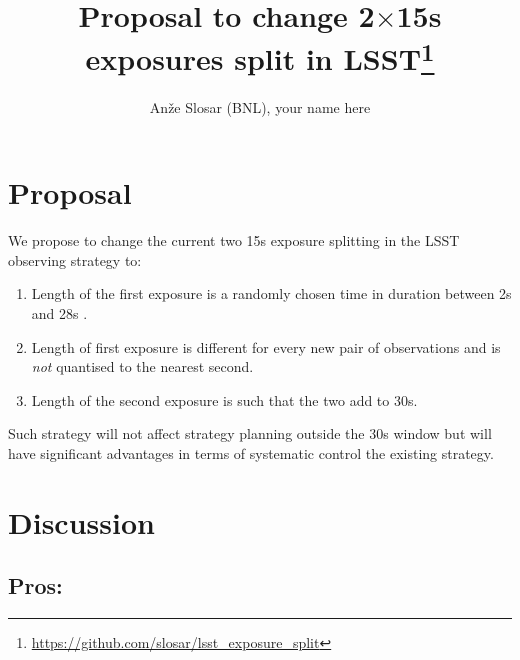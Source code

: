 \documentclass[12pt, a4paper]{article}
\begin{document}
\title{Proposal to change 2$\times$15s exposures split in LSST\thanks{\url{https://github.com/slosar/lsst_exposure_split}}}
\author{An\v{z}e Slosar (BNL), your name here }



\maketitle

\section*{Proposal}

We propose to change the current two 15s exposure splitting in the
LSST observing strategy to:

\begin{enumerate}
\item Length of the first exposure is a randomly chosen time in
  duration between 2s and 28s .

\item Length of first exposure is different for every new pair of
  observations and is \emph{not} quantised to the nearest second.

\item Length of the second exposure is such that the two add to 30s.
\end{enumerate}

Such strategy will not affect strategy planning outside the 30s window
but will have significant advantages in terms of systematic control
the existing strategy.



\section*{Discussion}


\subsection*{Pros:}
\end{document}
